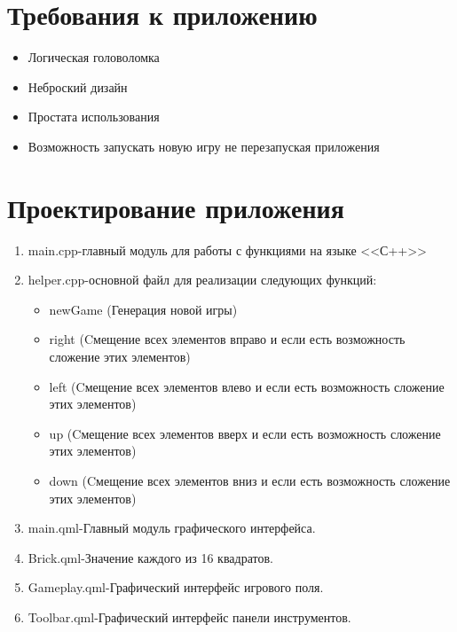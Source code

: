 \documentclass[a4paper,12pt]{article}
\begin{document}
\section{Требования к приложению}
\begin{itemize}
  \item Логическая головоломка
  \item Неброский дизайн
  \item Простата использования
  \item Возможность запускать новую игру не перезапуская приложения
\end{itemize}



 

\newpage
\section{Проектирование приложения}
\begin{enumerate}
\item main.cpp-главный модуль для работы с функциями на языке <<С++>>
\item helper.cpp-основной файл для реализации следующих функций:
\begin{itemize}
\item newGame (Генерация новой игры)
\item right (Cмещение всех элементов вправо и если есть возможность сложение этих элементов)
\item left (Cмещение всех элементов влево и если есть возможность сложение этих элементов)
\item up (Cмещение всех элементов вверх и если есть возможность сложение этих элементов)
\item down (Cмещение всех элементов вниз и если есть возможность сложение этих элементов)
\end{itemize}
\item main.qml-Главный модуль графического интерфейса.
\item Brick.qml-Значение каждого из 16 квадратов.
\item Gameplay.qml-Графический интерфейс игрового поля.
\item Toolbar.qml-Графический интерфейс панели инструментов.
\end{enumerate}
\end{document}
